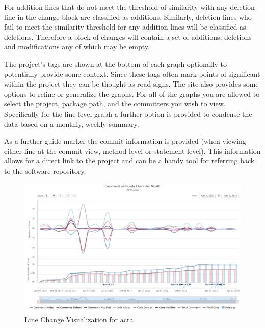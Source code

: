 For addition lines that do not meet the threshold of similarity with any deletion line in the change block are classified as additions. Similarly, deletion lines who fail to meet the similarity threshold for any addition lines will be classified as deletions. Therefore a block of changes will contain a set of additions, deletions and modifications any of which may be empty.



The project's tags are shown at the bottom of each graph optionally to potentially provide some context. Since these tags often mark points of significant within the project they can be thought as road signs. The site also provides some options to refine or generalize the graphs. For all of the graphs you are allowed to select the project, package path, and the committers you wish to view. Specifically for the line level graph a further option is provided to condense the data based on a monthly, weekly summary.

As a further guide marker the commit information is provided (when viewing either line at the commit view, method level or statement level). This information allows for a direct link to the project and can be a handy tool for referring back to the software repository.

\begin{figure}[!ht]
    \centering
        \includegraphics[width=1.0\textwidth]{images/lines_visual_acra}
    \caption{Line Change Visualization for acra}
    \label{fig:line_visual_acra}
\end{figure}

